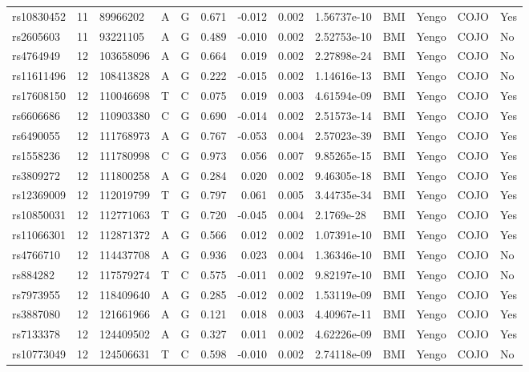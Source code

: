 \documentclass[11pt,twoside]{bristolthesis}
\begin{document}
\begin{longtable}[t]{lrlllrrrlllll}
rs10830452 & 11 & 89966202 & A & G & 0.671 & -0.012 & 0.002 & 1.56737e-10 & BMI & Yengo & COJO & Yes\\
rs2605603 & 11 & 93221105 & A & G & 0.489 & -0.010 & 0.002 & 2.52753e-10 & BMI & Yengo & COJO & No\\
rs4764949 & 12 & 103658096 & A & G & 0.664 & 0.019 & 0.002 & 2.27898e-24 & BMI & Yengo & COJO & No\\
\addlinespace
rs11611496 & 12 & 108413828 & A & G & 0.222 & -0.015 & 0.002 & 1.14616e-13 & BMI & Yengo & COJO & No\\
rs17608150 & 12 & 110046698 & T & C & 0.075 & 0.019 & 0.003 & 4.61594e-09 & BMI & Yengo & COJO & Yes\\
rs6606686 & 12 & 110903380 & C & G & 0.690 & -0.014 & 0.002 & 2.51573e-14 & BMI & Yengo & COJO & Yes\\
rs6490055 & 12 & 111768973 & A & G & 0.767 & -0.053 & 0.004 & 2.57023e-39 & BMI & Yengo & COJO & Yes\\
rs1558236 & 12 & 111780998 & C & G & 0.973 & 0.056 & 0.007 & 9.85265e-15 & BMI & Yengo & COJO & Yes\\
\addlinespace
rs3809272 & 12 & 111800258 & A & G & 0.284 & 0.020 & 0.002 & 9.46305e-18 & BMI & Yengo & COJO & Yes\\
rs12369009 & 12 & 112019799 & T & G & 0.797 & 0.061 & 0.005 & 3.44735e-34 & BMI & Yengo & COJO & Yes\\
rs10850031 & 12 & 112771063 & T & G & 0.720 & -0.045 & 0.004 & 2.1769e-28 & BMI & Yengo & COJO & Yes\\
rs11066301 & 12 & 112871372 & A & G & 0.566 & 0.012 & 0.002 & 1.07391e-10 & BMI & Yengo & COJO & Yes\\
rs4766710 & 12 & 114437708 & A & G & 0.936 & 0.023 & 0.004 & 1.36346e-10 & BMI & Yengo & COJO & No\\
\addlinespace
rs884282 & 12 & 117579274 & T & C & 0.575 & -0.011 & 0.002 & 9.82197e-10 & BMI & Yengo & COJO & No\\
rs7973955 & 12 & 118409640 & A & G & 0.285 & -0.012 & 0.002 & 1.53119e-09 & BMI & Yengo & COJO & Yes\\
rs3887080 & 12 & 121661966 & A & G & 0.121 & 0.018 & 0.003 & 4.40967e-11 & BMI & Yengo & COJO & Yes\\
rs7133378 & 12 & 124409502 & A & G & 0.327 & 0.011 & 0.002 & 4.62226e-09 & BMI & Yengo & COJO & Yes\\
rs10773049 & 12 & 124506631 & T & C & 0.598 & -0.010 & 0.002 & 2.74118e-09 & BMI & Yengo & COJO & No\\

\end{longtable}
\end{document}
